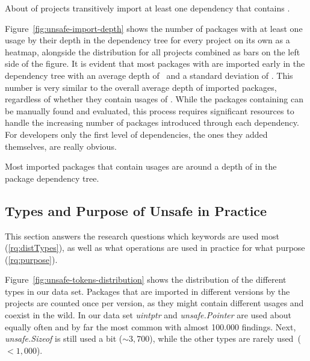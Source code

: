 \begin{tcolorbox}[boxsep=1pt, enlarge top by=5pt, title=Answer to \ref{rq:prevalDeps}]
About  of projects transitively import at least one dependency that contains \unsafe{}.
\end{tcolorbox}

Figure~\ref{fig:unsafe-import-depth} shows the number of packages with at least one \unsafe{} usage by their depth in the dependency tree for every project on its own as a heatmap, alongside the distribution for all projects combined as bars on the left side of the figure.
It is evident that most packages with \unsafe{} are imported early in the dependency tree with an average depth of \averageUnsafeImportDepth~and a standard deviation of \stdUnsafeImportDepth.
This number is very similar to the overall average depth of imported packages, regardless of whether they contain usages of \unsafe{}.
While the packages containing \unsafe{} can be manually found and evaluated, this process requires significant resources to handle the increasing number of packages introduced through each dependency. 
For developers only the first level of dependencies, the ones they added themselves, are really obvious.

\begin{tcolorbox}[boxsep=1pt, enlarge top by=5pt, title=Answer to \ref{rq:depsDepth}]
Most imported packages that contain \unsafe{} usages are around a depth of  in the package dependency tree.
\end{tcolorbox}


\subsection{Types and Purpose of Unsafe in Practice}

This section answers the research questions which \unsafe{} keywords are used most (\ref{rq:distTypes}), as well as what \unsafe{} operations are used in practice for what purpose (\ref{rq:purpose}).

Figure~\ref{fig:unsafe-tokens-distribution} shows the distribution of the different \unsafe{} types in our data set.
Packages that are imported in different versions by the projects are counted once per version, as they might contain different \unsafe{} usages and coexist in the wild.
In our data set \textit{uintptr} and \textit{unsafe.Pointer} are used about equally often and by far the most common with almost 100.000 findings. 
Next, \textit{unsafe.Sizeof} is still used a bit ($\sim 3,700$), while the other \unsafe{} types are rarely used~($< 1,000$).

